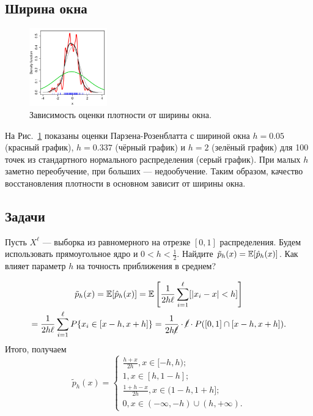 {\subsection*{Ширина окна}
\begin{figure}
    \includegraphics[width=0.3\textwidth]{chapters/bayesian/kde_bandwidth.png}
    \caption{Зависимость оценки плотности от ширины окна.}\label{kde:bandwidth}
\end{figure}

На Рис.~\ref{kde:bandwidth} показаны оценки Парзена-Розенблатта с шириной окна
$h=0.05$ (красный график), $h=0.337$ (чёрный график) и $h=2$ (зелёный график)
для 100 точек из стандартного нормального распределения (серый график). При
малых $h$ заметно переобучение, при больших --- недообучение. Таким образом,
качество восстановления плотности в основном зависит от ширины окна.

\newpage
\subsection*{Задачи}

\begin{problem}
Пусть $X^\ell$ --- выборка из равномерного на отрезке $[0,1]$ распределения.
Будем использовать прямоугольное ядро и $0 < h < \frac{1}{2}$. Найдите
$\tilde{p}_h(x) = \mathbb{E}[\hat{p}_h(x)]$. Как влияет параметр $h$ на точность
приближения в среднем?
\end{problem}

\begin{solution}
    \begin{multline*}
        \tilde{p}_h(x) = \mathbb{E}[\hat{p}_h(x)]
        = \mathbb{E}\left[\frac{1}{2h\ell}\sum_{i = 1}^\ell [|x_i - x| < h]\right]\\
        = \frac{1}{2h\ell}\sum_{i = 1}^\ell P\{x_i \in [x - h, x + h]\}
        = \frac{1}{2h \cancel{\ell}} \cdot \cancel{\ell} \cdot P([0, 1] \cap [x - h, x + h]).
    \end{multline*}
    Итого, получаем
    \begin{equation*}
        \tilde{p}_h(x) =
        \begin{cases}
            \frac{h + x}{2h}, x \in [-h, h);            \\
            1, x \in [h, 1 - h];                        \\
            \frac{1 + h - x}{2h}, x \in (1 - h, 1 + h]; \\
            0, x \in (-\infty, -h) \cup (h, +\infty).
        \end{cases}
    \end{equation*}


\end{solution}}
